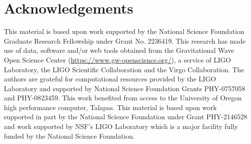 \documentclass[twocolumn]{aastex631}
\begin{document}





\section{Acknowledgements}\label{sec:acknowledments}
This material is based upon work supported by the National Science Foundation Graduate Research Fellowship under Grant No. 2236419. This research has made use of data, software and/or web tools obtained from the Gravitational Wave Open Science Center 
(\url{https://www.gw-openscience.org/}), a service of LIGO Laboratory, the LIGO Scientific Collaboration and the Virgo Collaboration. 
The authors are grateful for computational resources provided by the LIGO Laboratory and supported by National Science Foundation Grants PHY-0757058 and PHY-0823459.  
This work benefited from access to the University of Oregon high performance computer, Talapas. This material is based upon work supported 
in part by the National Science Foundation under Grant PHY-2146528 and work supported by NSF's LIGO Laboratory which is a major facility 
fully funded by the National Science Foundation.
{}




\end{document}
